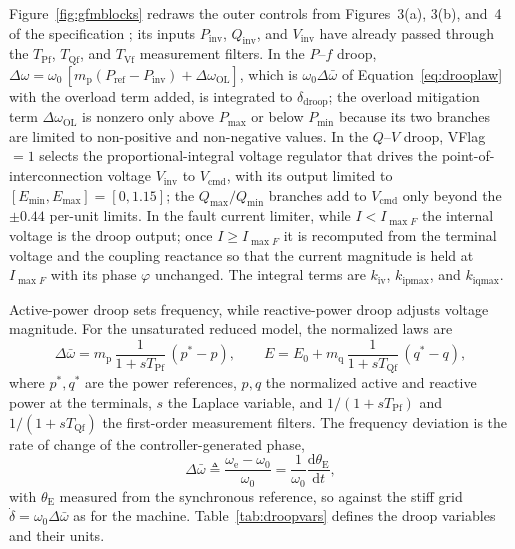 \documentclass[11pt]{article}
\begin{document}
Figure~\ref{fig:gfmblocks} redraws the outer controls from Figures~3(a), 3(b), and~4 of the specification \cite{du2023a1}; its inputs $P_{\mathrm{inv}}$, $Q_{\mathrm{inv}}$, and $V_{\mathrm{inv}}$ have already passed through the $T_{\mathrm{Pf}}$, $T_{\mathrm{Qf}}$, and $T_{\mathrm{Vf}}$ measurement filters. In the $P$--$f$ droop, $\Delta\omega=\omega_0\,[m_{\mathrm{p}}(P_{\mathrm{ref}}-P_{\mathrm{inv}})+\Delta\omega_{\mathrm{OL}}]$, which is $\omega_0\Delta\bar{\omega}$ of Equation~\eqref{eq:drooplaw} with the overload term added, is integrated to $\delta_{\mathrm{droop}}$; the overload mitigation term $\Delta\omega_{\mathrm{OL}}$ is nonzero only above $P_{\max}$ or below $P_{\min}$ because its two branches are limited to non-positive and non-negative values. In the $Q$--$V$ droop, VFlag~$=1$ selects the proportional-integral voltage regulator that drives the point-of-interconnection voltage $V_{\mathrm{inv}}$ to $V_{\mathrm{cmd}}$, with its output limited to $[E_{\min},E_{\max}]=[0,1.15]$; the $Q_{\max}/Q_{\min}$ branches add to $V_{\mathrm{cmd}}$ only beyond the $\pm0.44$ per-unit limits. In the fault current limiter, while $I<I_{\max F}$ the internal voltage is the droop output; once $I\ge I_{\max F}$ it is recomputed from the terminal voltage and the coupling reactance so that the current magnitude is held at $I_{\max F}$ with its phase $\varphi$ unchanged. The integral terms are $k_{\mathrm{iv}}$, $k_{\mathrm{ipmax}}$, and $k_{\mathrm{iqmax}}$.


Active-power droop sets frequency, while reactive-power droop adjusts voltage magnitude. For the unsaturated reduced model, the normalized laws are
\begin{equation}
\Delta\bar{\omega}=m_{\mathrm{p}}\,\frac{1}{1+sT_{\mathrm{Pf}}}\,(p^{*}-p),\qquad
E=E_0+m_{\mathrm{q}}\,\frac{1}{1+sT_{\mathrm{Qf}}}\,(q^{*}-q),
\label{eq:drooplaw}
\end{equation}
where $p^{*},q^{*}$ are the power references, $p,q$ the normalized active and reactive power at the terminals, $s$ the Laplace variable, and $1/(1+sT_{\mathrm{Pf}})$ and $1/(1+sT_{\mathrm{Qf}})$ the first-order measurement filters. The frequency deviation is the rate of change of the controller-generated phase,
\begin{equation}
\Delta\bar{\omega}\triangleq\frac{\omega_{\mathrm{e}}-\omega_0}{\omega_0}=\frac{1}{\omega_0}\frac{\mathrm{d}\theta_{\mathrm{E}}}{\mathrm{d}t},
\label{eq:phasedef}
\end{equation}
with $\theta_{\mathrm{E}}$ measured from the synchronous reference, so against the stiff grid $\dot\delta=\omega_0\Delta\bar{\omega}$ as for the machine. Table~\ref{tab:droopvars} defines the droop variables and their units.
\end{document}

